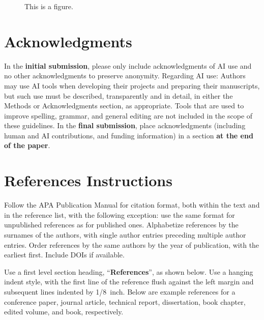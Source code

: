 \documentclass[10pt,letterpaper]{article}
\begin{document}
\begin{figure}[H]
  \begin{center}
  \end{center}
  \caption{This is a figure.}
  \label{sample-figure}
\end{figure}

\section{Acknowledgments}

In the \textbf{initial submission}, please only include acknowledgments of AI use and no other
acknowledgments to preserve anonymity. Regarding AI use: Authors may use AI tools when developing
their projects and preparing their manuscripts, but such use must be described, transparently and
in detail, in either the Methods or Acknowledgments section, as appropriate. Tools that are used to
improve spelling, grammar, and general editing are not included in the scope of these guidelines.
In the \textbf{final submission}, place acknowledgments (including human and AI contributions, and
funding information) in a section \textbf{at the end of the paper}.

\section{References Instructions}

Follow the APA Publication Manual for citation format, both within the text and in the reference
list, with the following exception: use the same format for unpublished references as for published
ones. Alphabetize references by the surnames of the authors, with single author entries preceding
multiple author entries. Order references by the same authors by the year of publication, with the
earliest first. Include DOIs if available.

Use a first level section heading, ``\textbf{References}'', as shown below. Use a hanging indent
style, with the first line of the reference flush against the left margin and subsequent lines
indented by 1/8~inch. Below are example references for a conference paper, journal article,
technical report, dissertation, book chapter, edited volume, and book, respectively.

\nocite{August2007}
\nocite{DaphneEcho2022}
\nocite{FitzgeraldGalli1985}
\nocite{Hakuole2001}
\nocite{Issa1963}
\nocite{Lobsang2023}
\nocite{MitanniNovember1972}

\printbibliography
\end{document}
